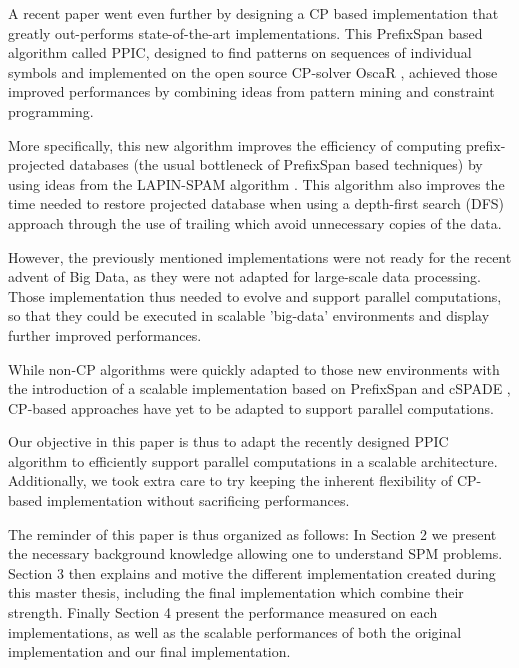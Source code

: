 \documentclass{eplmastersthesis}
\begin{document}
A recent paper \cite{aoga2016efficient} went even further by designing a CP based implementation that greatly out-performs state-of-the-art implementations. This PrefixSpan based algorithm called PPIC, designed to find patterns on sequences of individual symbols and implemented on the open source CP-solver OscaR \cite{oscar}, achieved those improved performances by combining ideas from pattern
mining and constraint programming. \newline

More specifically, this new algorithm improves the efficiency of computing prefix-projected databases (the usual bottleneck of PrefixSpan based techniques) by using ideas from the LAPIN-SPAM algorithm \cite{yang2007lapin}. This algorithm also improves the time needed to restore projected database when using a depth-first search (DFS) approach through the use of trailing which avoid unnecessary copies of the data. \newline

However, the previously mentioned implementations were not ready for the recent advent of Big Data, as they were not adapted for large-scale data processing. Those implementation thus needed to evolve and support parallel computations, so that they could be executed in scalable 'big-data' environments and display further improved performances. \newline

While non-CP algorithms were quickly adapted to those new environments with the introduction of a scalable implementation based on PrefixSpan \cite{deng2014towards} and cSPADE \cite{ho2000large}, CP-based approaches have yet to be adapted to support parallel computations. \newline

Our objective in this paper is thus to adapt the recently designed PPIC algorithm to efficiently support parallel computations in a scalable architecture. Additionally, we took extra care to try keeping the inherent flexibility of CP-based implementation without sacrificing performances. \newline

The reminder of this paper is thus organized as follows: 
In Section 2 we present the necessary background knowledge allowing one to understand SPM problems. Section 3 then explains and motive the different implementation created during this master thesis, including the final implementation which combine their strength. Finally Section 4 present the performance measured on each implementations, as well as the scalable performances of both the original implementation and our final implementation.
\end{document}
